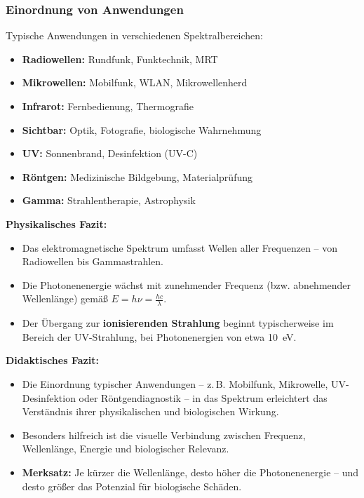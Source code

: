 \subsubsection{Einordnung von Anwendungen}

Typische Anwendungen in verschiedenen Spektralbereichen:

\begin{itemize}
	\item \textbf{Radiowellen:} Rundfunk, Funktechnik, MRT
	\item \textbf{Mikrowellen:} Mobilfunk, WLAN, Mikrowellenherd
	\item \textbf{Infrarot:} Fernbedienung, Thermografie
	\item \textbf{Sichtbar:} Optik, Fotografie, biologische Wahrnehmung
	\item \textbf{UV:} Sonnenbrand, Desinfektion (UV-C)
	\item \textbf{Röntgen:} Medizinische Bildgebung, Materialprüfung
	\item \textbf{Gamma:} Strahlentherapie, Astrophysik
\end{itemize}

\begin{tcolorbox}[hinweisbox,title=Fazit zum elektromagnetischen Spektrum]
	\label{box:Fazit zum elektro}
	\textbf{Physikalisches Fazit:}
	
	\begin{itemize}
		\item Das elektromagnetische Spektrum umfasst Wellen aller Frequenzen – von Radiowellen bis Gammastrahlen.
		\item Die Photonenenergie wächst mit zunehmender Frequenz (bzw. abnehmender Wellenlänge) gemäß \(E = h \nu = \frac{hc}{\lambda}\).
		\item Der Übergang zur \textbf{ionisierenden Strahlung} beginnt typischerweise im Bereich der UV-Strahlung, bei Photonenergien von etwa \SI{10}{\electronvolt}.
	\end{itemize}
	
	\vspace{0.5em}
	\textbf{Didaktisches Fazit:}
	
	\begin{itemize}
		\item Die Einordnung typischer Anwendungen – z.\,B. Mobilfunk, Mikrowelle, UV-Desinfektion oder Röntgendiagnostik – in das Spektrum erleichtert das Verständnis ihrer physikalischen und biologischen Wirkung.
		\item Besonders hilfreich ist die visuelle Verbindung zwischen Frequenz, Wellenlänge, Energie und biologischer Relevanz.
		\item \textbf{Merksatz:} Je kürzer die Wellenlänge, desto höher die Photonenenergie – und desto größer das Potenzial für biologische Schäden.
	\end{itemize}
\end{tcolorbox}
\newpage
\noindent
